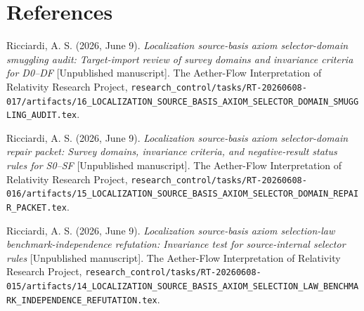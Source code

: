 \documentclass[11pt]{article}
\begin{document}
\section*{References}

Ricciardi, A. S. (2026, June 9). \emph{Localization source-basis axiom
selector-domain smuggling audit: Target-import review of survey domains and
invariance criteria for D0--DF} [Unpublished manuscript]. The Aether-Flow
Interpretation of Relativity Research Project,
\texttt{research\_control/tasks/RT-20260608-017/artifacts/16\_LOCALIZATION\_SOURCE\_BASIS\_AXIOM\_SELECTOR\_DOMAIN\_SMUGGLING\_AUDIT.tex}.

Ricciardi, A. S. (2026, June 9). \emph{Localization source-basis axiom
selector-domain repair packet: Survey domains, invariance criteria, and
negative-result status rules for S0--SF} [Unpublished manuscript]. The
Aether-Flow Interpretation of Relativity Research Project,
\texttt{research\_control/tasks/RT-20260608-016/artifacts/15\_LOCALIZATION\_SOURCE\_BASIS\_AXIOM\_SELECTOR\_DOMAIN\_REPAIR\_PACKET.tex}.

Ricciardi, A. S. (2026, June 9). \emph{Localization source-basis axiom
selection-law benchmark-independence refutation: Invariance test for
source-internal selector rules} [Unpublished manuscript]. The Aether-Flow
Interpretation of Relativity Research Project,
\texttt{research\_control/tasks/RT-20260608-015/artifacts/14\_LOCALIZATION\_SOURCE\_BASIS\_AXIOM\_SELECTION\_LAW\_BENCHMARK\_INDEPENDENCE\_REFUTATION.tex}.
\end{document}
